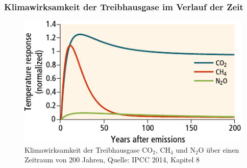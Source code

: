 \begin{frame}
	\frametitle{Klimawirksamkeit der Treibhausgase im Verlauf der Zeit}

		\begin{figure}
			\centering
			  \includegraphics[width=.7\linewidth]{bilder/ghg-forcings-over-time.pdf}
			  \caption{Klimawirksamkeit der Treibhausgase CO$_2$, CH$_4$ und N$_2$O über einen Zeitraum von 200 Jahren, Quelle: IPCC 2014, Kapitel 8}
		\end{figure}


\end{frame}
